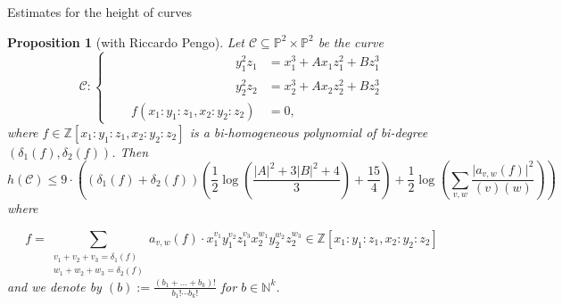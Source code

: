 \documentclass[12pt]{beamer}
\newtheorem{prop}{Proposition}
\begin{document}
\begin{frame}{Estimates for the height of  curves}


\begin{prop}[with Riccardo Pengo] 

Let $\mathcal{C} \subseteq \mathbb{P}^2 \times \mathbb{P}^2$ be the curve
	\begin{equation*} \label{eq:curve_C}
		\mathcal{C} \colon \begin{cases}
			\phantom{P(x_1 \colon y_1 \colon z_1,x_2 \colon y_2 \colon z_2)}y_1^2 z_1 &= x_1^3 + A x_1 z_1^2 + B z_1^3 \\
			\phantom{P(x_1 \colon y_1 \colon z_1,x_2 \colon y_2 \colon z_2)}y_2^2 z_2 &= x_2^3 + A x_2 z_2^2 + B z_2^3 \\
			\phantom{y_1^2 z_1}f(x_1 \colon y_1 \colon z_1,x_2 \colon y_2 \colon z_2) &= 0,
		\end{cases}
	\end{equation*}
	where $f \in  \mathbb{Z}[x_1 \colon y_1 \colon z_1,x_2 \colon y_2 \colon z_2]$ is a bi-homogeneous polynomial of bi-degree $(\delta_1(f),\delta_2(f))$. Then
	\[
		h(\mathcal{C}) \leq 9 \cdot \left((\delta_1(f) + \delta_2(f)) \left(\frac{1}{2} \log\left( \frac{\lvert A \rvert^2  + 3 \lvert B \rvert ^2 + 4}{3} \right) + \frac{15}{4}\right) + \frac{1}{2} \log\left( \sum_{v,w} \frac{\lvert a_{v,w}(f) \rvert^2}{(v) (w)} \right)\right)
	\]
	where 
	
	\[
		f = \sum_{\substack{v_1 + v_2 + v_3 = \delta_1(f) \\ w_1 + w_2 + w_3 = \delta_2(f)}} a_{v,w}(f) \cdot x_1^{v_1} y_1^{v_2} z_1^{v_3} x_2^{w_1} y_2^{w_2} z_2^{w_3} \in \mathbb{Z}[x_1 \colon y_1 \colon z_1,x_2 \colon y_2 \colon z_2]
	\] and  we denote by $(b) := \frac{(b_1+\dots+b_k)!}{b_1! \cdots b_k!}$ for $b\in \mathbb{N}^k$.

\end{prop}
	
	

\end{frame}
\end{document}
